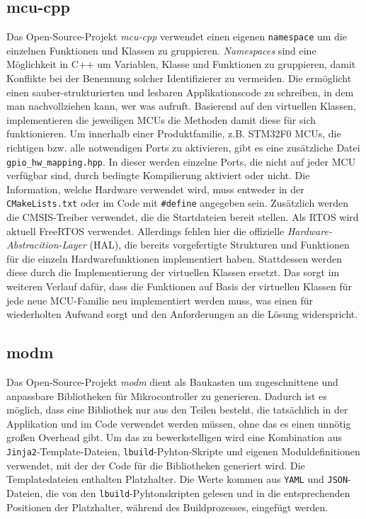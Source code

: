 

\subsection{mcu-cpp}
Das Open-Source-Projekt \emph{mcu-cpp} verwendet einen eigenen \texttt{namespace} um die einzelnen Funktionen und Klassen zu gruppieren.
\emph{Namespaces} sind eine Möglichkeit in C++ um Variablen, Klasse und Funktionen zu gruppieren, damit Konflikte bei der Benennung solcher Identifizierer zu vermeiden.
Die ermöglicht einen sauber-strukturierten und lesbaren Applikationscode zu schreiben, in dem man nachvollziehen kann, wer was aufruft.
Basierend auf den virtuellen Klassen, implementieren die jeweiligen MCUs die Methoden damit diese für sich funktionieren.
Um innerhalb einer Produktfamilie, z.B. STM32F0 MCUs, die richtigen bzw. alle notwendigen Ports zu aktivieren, gibt es eine zusätzliche Datei \texttt{gpio\_hw\_mapping.hpp}.
In dieser werden einzelne Ports, die nicht auf jeder MCU verfügbar sind, durch bedingte Kompilierung aktiviert oder nicht.
Die Information, welche Hardware verwendet wird, muss entweder in der \texttt{CMakeLists.txt} oder im Code mit \texttt{\#define} angegeben sein.
Zusätzlich werden die CMSIS-Treiber verwendet, die die Startdateien bereit stellen.
Als RTOS wird aktuell FreeRTOS verwendet.
Allerdings fehlen hier die offizielle \emph{Hardware-Abstracition-Layer} (HAL), die bereits vorgefertigte Strukturen und Funktionen für die einzeln Hardwarefunktionen implementiert haben.
Stattdessen werden diese durch die Implementierung der virtuellen Klassen ersetzt.
Das sorgt im weiteren Verlauf dafür, dass die Funktionen auf Basis der virtuellen Klassen für jede neue MCU-Familie neu implementiert werden muss, was einen für wiederholten Aufwand sorgt und den Anforderungen an die Lösung widerspricht.



\subsection{modm}
Das Open-Source-Projekt \emph{modm} dient als Baukasten um zugeschnittene und anpassbare Bibliotheken für Mikrocontroller zu generieren.
Dadurch ist es möglich, dass eine Bibliothek nur aus den Teilen besteht, die tatsächlich in der Applikation und im Code verwendet werden müssen, ohne das es einen unnötig großen Overhead gibt.
Um das zu bewerkstelligen wird eine Kombination aus \texttt{Jinja2}-Template-Dateien, \texttt{lbuild}-Pyhton-Skripte und eigenen Moduldefinitionen verwendet, mit der der Code für die Bibliotheken generiert wird.
Die Templatedateien enthalten Platzhalter.
Die Werte kommen aus \texttt{YAML} und \texttt{JSON}-Dateien, die von den \texttt{lbuild}-Pyhtonskripten gelesen und in die entsprechenden Positionen der Platzhalter, während des Buildprozesses, eingefügt werden.

